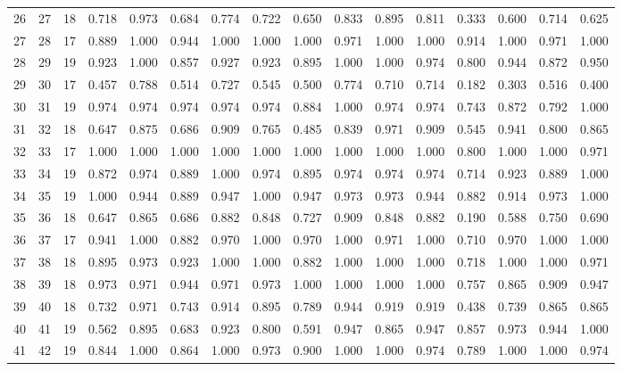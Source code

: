 \begin{longtable}{lrllllllllllllll}
26 & 27 & 18 & 0.718 & 0.973 & 0.684 & 0.774 & 0.722 & 0.650 & 0.833 & 0.895 & 0.811 & 0.333 & 0.600 & 0.714 & 0.625 \\
27 & 28 & 17 & 0.889 & 1.000 & 0.944 & 1.000 & 1.000 & 1.000 & 0.971 & 1.000 & 1.000 & 0.914 & 1.000 & 0.971 & 1.000 \\
28 & 29 & 19 & 0.923 & 1.000 & 0.857 & 0.927 & 0.923 & 0.895 & 1.000 & 1.000 & 0.974 & 0.800 & 0.944 & 0.872 & 0.950 \\
29 & 30 & 17 & 0.457 & 0.788 & 0.514 & 0.727 & 0.545 & 0.500 & 0.774 & 0.710 & 0.714 & 0.182 & 0.303 & 0.516 & 0.400 \\
30 & 31 & 19 & 0.974 & 0.974 & 0.974 & 0.974 & 0.974 & 0.884 & 1.000 & 0.974 & 0.974 & 0.743 & 0.872 & 0.792 & 1.000 \\
31 & 32 & 18 & 0.647 & 0.875 & 0.686 & 0.909 & 0.765 & 0.485 & 0.839 & 0.971 & 0.909 & 0.545 & 0.941 & 0.800 & 0.865 \\
32 & 33 & 17 & 1.000 & 1.000 & 1.000 & 1.000 & 1.000 & 1.000 & 1.000 & 1.000 & 1.000 & 0.800 & 1.000 & 1.000 & 0.971 \\
33 & 34 & 19 & 0.872 & 0.974 & 0.889 & 1.000 & 0.974 & 0.895 & 0.974 & 0.974 & 0.974 & 0.714 & 0.923 & 0.889 & 1.000 \\
34 & 35 & 19 & 1.000 & 0.944 & 0.889 & 0.947 & 1.000 & 0.947 & 0.973 & 0.973 & 0.944 & 0.882 & 0.914 & 0.973 & 1.000 \\
35 & 36 & 18 & 0.647 & 0.865 & 0.686 & 0.882 & 0.848 & 0.727 & 0.909 & 0.848 & 0.882 & 0.190 & 0.588 & 0.750 & 0.690 \\
36 & 37 & 17 & 0.941 & 1.000 & 0.882 & 0.970 & 1.000 & 0.970 & 1.000 & 0.971 & 1.000 & 0.710 & 0.970 & 1.000 & 1.000 \\
37 & 38 & 18 & 0.895 & 0.973 & 0.923 & 1.000 & 1.000 & 0.882 & 1.000 & 1.000 & 1.000 & 0.718 & 1.000 & 1.000 & 0.971 \\
38 & 39 & 18 & 0.973 & 0.971 & 0.944 & 0.971 & 0.973 & 1.000 & 1.000 & 1.000 & 1.000 & 0.757 & 0.865 & 0.909 & 0.947 \\
39 & 40 & 18 & 0.732 & 0.971 & 0.743 & 0.914 & 0.895 & 0.789 & 0.944 & 0.919 & 0.919 & 0.438 & 0.739 & 0.865 & 0.865 \\
40 & 41 & 19 & 0.562 & 0.895 & 0.683 & 0.923 & 0.800 & 0.591 & 0.947 & 0.865 & 0.947 & 0.857 & 0.973 & 0.944 & 1.000 \\
41 & 42 & 19 & 0.844 & 1.000 & 0.864 & 1.000 & 0.973 & 0.900 & 1.000 & 1.000 & 0.974 & 0.789 & 1.000 & 1.000 & 0.974 \\
\end{longtable}
